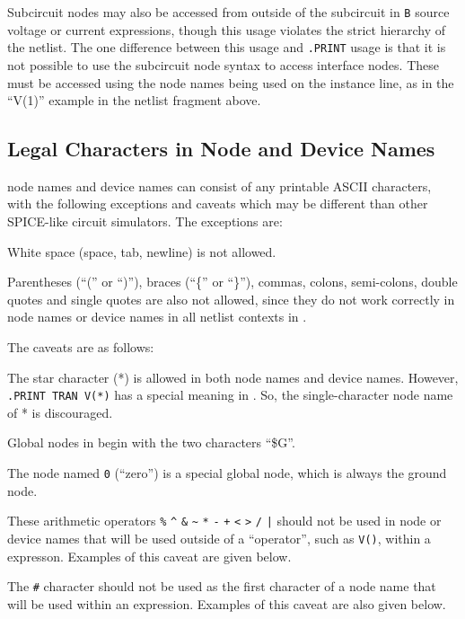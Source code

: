 Subcircuit nodes may also be accessed from outside of the subcircuit
in \texttt{B} source voltage or current expressions, though this usage
violates the strict hierarchy of the netlist.  The one difference
between this usage and \texttt{.PRINT} usage is that it is not
possible to use the subcircuit node syntax to access interface nodes.
These must be accessed using the node names being used on the instance
line, as in the ``V(1)'' example in the netlist fragment above.

\subsection{Legal Characters in Node and Device Names}
\label{legalCharacters}
 
\Xyce{} node names and device names can consist of any printable ASCII
characters, with the following exceptions and caveats which may be
different than other SPICE-like circuit simulators.  The exceptions are:
\begin{XyceItemize}
\item White space (space, tab, newline) is not allowed.
\item Parentheses (``('' or ``)''), braces (``\{'' or ``\}''), commas,
colons, semi-colons, double quotes and single quotes are also not
allowed, since they do not work correctly in node names or device names
in all netlist contexts in \Xyce{}.
\end{XyceItemize}
The caveats are as follows:
\begin{XyceItemize}
\item The star character (*) is allowed in both node names and device
names.  However, \texttt{.PRINT TRAN V(*)} has a special meaning in \Xyce{}.
So, the single-character node name of * is discouraged.
\item Global nodes in \Xyce{} begin with the two characters ``\$G''.
\item The node named \texttt{0} (``zero'') is a special global node,
which is always the ground node.
\item These arithmetic operators \verb|%| \verb|^| \verb|&|
\verb|~| \verb|*| \verb|-| \verb|+| \verb|<| \verb|>| \verb|/|
\verb+|+ should not be used in node or device names that will
be used outside of a \Xyce{} ``operator'', such as \texttt{V()}, within
a \Xyce{} expresson.  Examples of this caveat are given below.
\item The \verb|#| character should not be used as the first character
of a node name that will be used within an expression.  Examples of this
caveat are also given below.
\end{XyceItemize}
